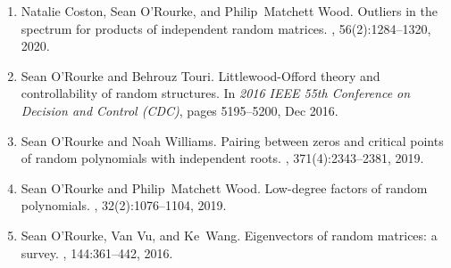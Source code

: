 \documentclass[letterpaper]{article}
\begin{document}
\begin{enumerate}
	\item Natalie Coston, Sean O'Rourke, and Philip~Matchett Wood.
	\newblock Outliers in the spectrum for products of independent random matrices.
	, 56(2):1284--1320, 2020.
	\item Sean O'Rourke and Behrouz Touri.
	\newblock Littlewood-Offord theory and controllability of random structures.
	\newblock In {\em 2016 IEEE 55th Conference on Decision and Control (CDC)}, pages 5195--5200, Dec 2016.
	\item Sean O'Rourke and Noah Williams.
	\newblock Pairing between zeros and critical points of random polynomials with independent roots.
	, 371(4):2343--2381, 2019.
	\item Sean O'Rourke and Philip~Matchett Wood.
	\newblock Low-degree factors of random polynomials.
	, 32(2):1076--1104, 2019.
	\item Sean O'Rourke, Van Vu, and Ke~Wang.
	\newblock Eigenvectors of random matrices: a survey.
	, 144:361--442, 2016.

\end{enumerate}
\end{document}
